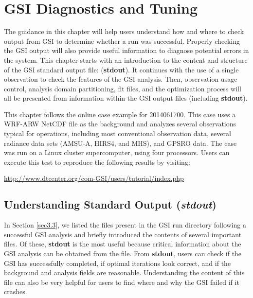 \chapter{GSI Diagnostics and Tuning}\label{gsi_diag}
\setlength{\parskip}{12pt}

The guidance in this chapter will help users understand how and where to check output from GSI to determine whether a run was successful. Properly checking the GSI output will also provide useful information to diagnose potential errors in the system. This chapter starts with an introduction to the content and structure of the GSI standard output file: (\textbf{stdout}). It continues with the use of a single observation to check the features of the GSI analysis. Then, observation usage control, analysis domain partitioning, fit files, and the optimization process will all be presented from information within the GSI output files (including \textbf{stdout}).

This chapter follows the online case example for 2014061700. This case uses a WRF-ARW NetCDF file as the background and analyzes several observations typical for operations, including most conventional observation data, several radiance data sets (AMSU-A, HIRS4, and MHS), and GPSRO data. The case was run on a Linux cluster supercomputer, using four processors. Users can execute this test to reproduce the following results by visiting: 

\begin{center}
\url{http://www.dtcenter.org/com-GSI/users/tutorial/index.php}
\end{center}

\section{Understanding Standard Output (\textit{stdout})}
\label{sec4.1}

In Section \ref{sec3.3}, we listed the files present in the GSI run directory following a successful GSI analysis and briefly introduced the contents of several important files. Of these, \textbf{stdout} is the most useful because critical information about the GSI analysis can be obtained from the file. From \textbf{stdout}, users can check if the GSI has successfully completed, if optimal iterations look correct, and if the background and analysis fields are reasonable. Understanding the content of this file can also be very helpful for users to find where and why the GSI failed if it crashes. 

